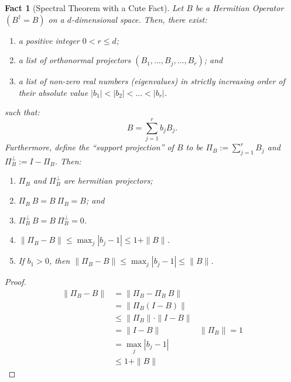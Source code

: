 \documentclass[12pt]{article}
\theoremstyle{plain}
\newtheorem{fact}[theorem]{Fact}
\begin{document}
\begin{fact}[Spectral Theorem with a Cute Fact]
    Let $B$ be a Hermitian Operator $(B^\dagger = B)$ on a $d$-dimensional space. Then, there exist:
\begin{enumerate}
    \item a positive integer $0 < r \leq d$;
    \item a list of orthonormal projectors $\left(B_1, \dots, B_j, \dots, B_{r}\right)$; and 
    \item a list of non-zero real numbers (eigenvalues) in strictly increasing order of their absolute value $|b_1| < |b_2| <\dots < |b_r|$.
\end{enumerate}
 such that:
\begin{equation}
    B = \sum\limits_{j = 1}^{r} b_j B_j.
\end{equation}
Furthermore, define the ``support projection'' of $B$ to be $\Pi_B := \sum\limits_{j = 1}^r B_j$ and $\Pi_B^\bot := I - \Pi_B$. Then:
\begin{enumerate}
    \item $\Pi_B$ and $\Pi_B^\bot$ are hermitian projectors;
    \item $\Pi_B\ B = B\ \Pi_B = B$; and
    \item $\Pi_B^\bot\ B = B \ \Pi_B^\bot = 0$.
    \item $\|\Pi_B - B \| \leq \max_{j} | b_j - 1|\leq 1 + \| B \|$.
    \item If $b_1 > 0$, then $\|\Pi_B - B \| \leq \max_{j} |b_j - 1|\leq \| B \|$.
\end{enumerate}
\end{fact}
\begin{proof}
    \begin{align*}
        \|\Pi_B - B \| &= \|\Pi_B - \Pi_B\ B \| \\
        &= \|\Pi_B \left(I - B\right)\|\\
        &\leq \|\Pi_B\| \cdot \|I - B\|\\
        &= \|I - B\| & \|\Pi_B\| = 1\\
        &= \max_{j} |b_j - 1|\\
        &\leq 1 + \|B\|
    \end{align*}
\end{proof}



\end{document}
